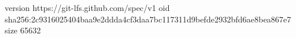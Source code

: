 version https://git-lfs.github.com/spec/v1
oid sha256:2c9316025404baa9e2ddda4cf3daa7bc117311d9befde2932bfd6ae8bea867e7
size 65632
